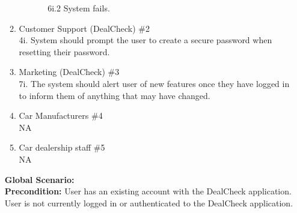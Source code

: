 \documentclass[]{article}
\begin{document}
\begin{enumerate}[{\bf {BE}1.}]
\begin{enumerate}[{\bf VP1.}]
\begin{enumerate}
\begin{enumerate}
    			\item [6i.2] System fails.
    		\end{enumerate}
            \end{enumerate}
		\item Customer Support (DealCheck) \#2 \\
			4i. System should prompt the user to create a secure password when resetting their password.
		\item Marketing (DealCheck) \#3 \\
			7i. The system should alert user of new features once they have logged in to inform them of anything that may have changed.
		\item Car Manufacturers \#4 \\
			NA
		\item Car dealership staff \#5 \\
			NA
	\end{enumerate}
	{\bf Global Scenario:}\\
	{\bf Precondition:} User has an existing account with the DealCheck application. User is not currently logged in or authenticated to the DealCheck application.


\end{enumerate}
\end{document}
